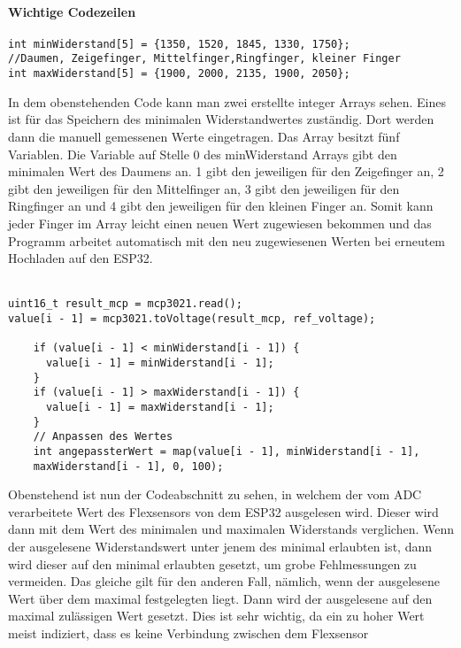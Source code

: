 \documentclass[titlepage,12pt,twoside]{article}
\begin{document}
\paragraph{Wichtige Codezeilen}
\hfill \break
\hfill \break
\footnotesize
\begin{lstlisting}
int minWiderstand[5] = {1350, 1520, 1845, 1330, 1750};  
//Daumen, Zeigefinger, Mittelfinger,Ringfinger, kleiner Finger
int maxWiderstand[5] = {1900, 2000, 2135, 1900, 2050};
\end{lstlisting}
\hfill \break
\normalsize
In dem obenstehenden Code kann man zwei erstellte integer Arrays sehen. Eines ist 
für das Speichern des minimalen Widerstandwertes zuständig. Dort werden dann die 
manuell gemessenen Werte eingetragen. Das Array besitzt fünf Variablen. Die Variable 
auf Stelle 0 des minWiderstand Arrays gibt den minimalen Wert des Daumens an. 1 gibt 
den jeweiligen für den Zeigefinger an, 2 gibt den jeweiligen für den Mittelfinger an, 
3 gibt den jeweiligen für den Ringfinger an und 4 gibt den jeweiligen für den 
kleinen Finger an. Somit kann jeder Finger im Array leicht einen neuen Wert 
zugewiesen bekommen und das Programm arbeitet automatisch mit den neu zugewiesenen 
Werten bei erneutem Hochladen auf den ESP32. \\
\\
\footnotesize
\begin{lstlisting}
uint16_t result_mcp = mcp3021.read();
value[i - 1] = mcp3021.toVoltage(result_mcp, ref_voltage);

    if (value[i - 1] < minWiderstand[i - 1]) {
      value[i - 1] = minWiderstand[i - 1];
    }
    if (value[i - 1] > maxWiderstand[i - 1]) {
      value[i - 1] = maxWiderstand[i - 1];
    }
    // Anpassen des Wertes
    int angepassterWert = map(value[i - 1], minWiderstand[i - 1],
	maxWiderstand[i - 1], 0, 100);
\end{lstlisting}
\hfill \break
\normalsize
Obenstehend ist nun der Codeabschnitt zu sehen, in welchem der vom ADC verarbeitete 
Wert des Flexsensors von dem ESP32 ausgelesen wird. Dieser wird dann mit dem Wert 
des minimalen und maximalen Widerstands verglichen. Wenn der ausgelesene Widerstandswert 
unter jenem des minimal erlaubten ist, dann wird dieser auf den minimal erlaubten 
gesetzt, um grobe Fehlmessungen zu vermeiden. Das gleiche gilt für den anderen Fall, 
nämlich, wenn der ausgelesene Wert über dem maximal festgelegten liegt. Dann wird 
der ausgelesene auf den maximal zulässigen Wert gesetzt. Dies ist sehr wichtig, da 
ein zu hoher Wert meist indiziert, dass es keine Verbindung zwischen dem Flexsensor 
\end{document}
